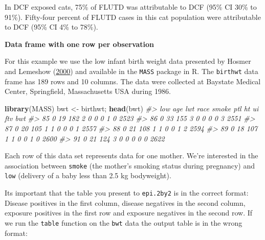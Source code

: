 \documentclass[
]{article}
\newenvironment{Shaded}{\begin{snugshade}}{\end{snugshade}}
\newcommand{\CommentTok}[1]{\textcolor[rgb]{0.56,0.35,0.01}{\textit{#1}}}
\newcommand{\DataTypeTok}[1]{\textcolor[rgb]{0.13,0.29,0.53}{#1}}
\newcommand{\KeywordTok}[1]{\textcolor[rgb]{0.13,0.29,0.53}{\textbf{#1}}}
\newcommand{\NormalTok}[1]{#1}
\newcommand{\OperatorTok}[1]{\textcolor[rgb]{0.81,0.36,0.00}{\textbf{#1}}}
\newcommand{\StringTok}[1]{\textcolor[rgb]{0.31,0.60,0.02}{#1}}
\begin{document}
In DCF exposed cats, 75\% of FLUTD was attributable to DCF (95\% CI 30\%
to 91\%). Fifty-four percent of FLUTD cases in this cat population were
attributable to DCF (95\% CI 4\% to 78\%).

\textbf{Data frame with one row per observation}

For this example we use the low infant birth weight data presented by
Hosmer and Lemeshow (\protect\hyperlink{ref-hosmer_lemeshow:2000}{2000})
and available in the \texttt{MASS} package in R. The \texttt{birthwt}
data frame has 189 rows and 10 columns. The data were collected at
Baystate Medical Center, Springfield, Massachusetts USA during 1986.

\begin{Shaded}
\begin{Highlighting}[]
\KeywordTok{library}\NormalTok{(MASS)}
\NormalTok{bwt \textless{}{-}}\StringTok{ }\NormalTok{birthwt; }\KeywordTok{head}\NormalTok{(bwt)}
\CommentTok{\#\textgreater{}    low age lwt race smoke ptl ht ui ftv  bwt}
\CommentTok{\#\textgreater{} 85   0  19 182    2     0   0  0  1   0 2523}
\CommentTok{\#\textgreater{} 86   0  33 155    3     0   0  0  0   3 2551}
\CommentTok{\#\textgreater{} 87   0  20 105    1     1   0  0  0   1 2557}
\CommentTok{\#\textgreater{} 88   0  21 108    1     1   0  0  1   2 2594}
\CommentTok{\#\textgreater{} 89   0  18 107    1     1   0  0  1   0 2600}
\CommentTok{\#\textgreater{} 91   0  21 124    3     0   0  0  0   0 2622}
\end{Highlighting}
\end{Shaded}

Each row of this data set represents data for one mother. We're
interested in the association between \texttt{smoke} (the mother's
smoking status during pregnancy) and \texttt{low} (delivery of a baby
less than 2.5 kg bodyweight).

Its important that the table you present to \texttt{epi.2by2} is in the
correct format: Disease positives in the first column, disease negatives
in the second column, exposure positives in the first row and exposure
negatives in the second row. If we run the \texttt{table} function on
the \texttt{bwt} data the output table is in the wrong format:

\begin{Shaded}
\end{Shaded}
\end{document}
